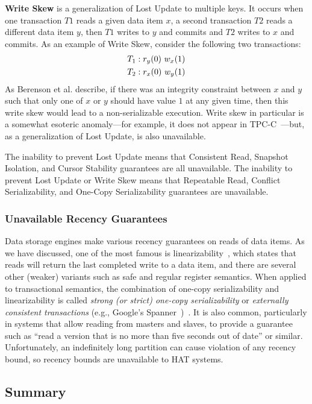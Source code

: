 \textbf{Write Skew} is a generalization of Lost Update to multiple
keys. It occurs when one transaction $T1$ reads a given data item $x$,
a second transaction $T2$ reads a different data item $y$, then $T1$
writes to $y$ and commits and $T2$ writes to $x$ and commits. As an
example of Write Skew, consider the following two transactions:
\begin{align*}
\small
T_1 &: r_y(0)~w_x(1)
\\T_2 &: r_x(0)~w_y(1)
\end{align*}
As Berenson et al. describe, if there was an integrity constraint
between $x$ and $y$ such that only one of $x$ or $y$ should have value
$1$ at any given time, then this write skew would lead to a
non-serializable execution. Write skew in particular is a somewhat
esoteric anomaly---for example, it does not appear in
TPC-C~\cite{snapshot-serializable}---but, as a generalization of Lost
Update, is also unavailable.

The inability to prevent Lost Update means that Consistent Read,
Snapshot Isolation, and Cursor Stability guarantees are all
unavailable. The inability to prevent Lost Update or Write Skew means
that Repeatable Read, Conflict Serializability, and One-Copy
Serializability guarantees are unavailable.

\subsubsection{Unavailable Recency Guarantees}

Data storage engines make various recency guarantees on reads of data
items. As we have discussed, one of the most famous is
linearizability~\cite{herlihy-art}, which states that reads will
return the last completed write to a data item, and there are several
other (weaker) variants such as safe and regular register
semantics. When applied to transactional semantics, the combination of
one-copy serializability and linearizability is called \textit{strong
  (or strict) one-copy serializability} or \textit{externally
  consistent transactions} (e.g., Google's
Spanner~\cite{spanner})~\cite{adya}. It is also common, particularly
in systems that allow reading from masters and slaves, to provide a
guarantee such as ``read a version that is no more than five seconds
out of date'' or similar. Unfortunately, an indefinitely long
partition can cause violation of any recency bound, so recency bounds
are unavailable to HAT systems.

\subsection{Summary}
\label{sec:hat-summary}

